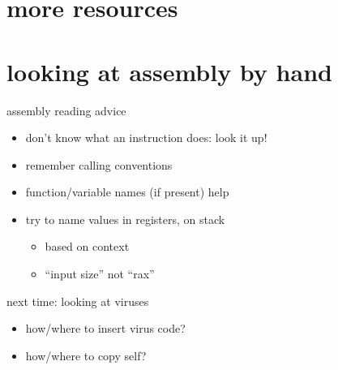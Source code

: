 \section{more resources}

\section{looking at assembly by hand}

\begin{frame}{assembly reading advice}
    \begin{itemize}
    \item don't know what an instruction does: look it up!
    \item remember calling conventions
    \item function/variable names (if present) help
    \item try to name values in registers, on stack
        \begin{itemize}
        \item based on context
        \item ``input size'' not ``rax''
        \end{itemize}
    \end{itemize}
\end{frame}

\begin{frame}{next time: looking at viruses}
    \begin{itemize}
    \item how/where to insert virus code?
    \item how/where to copy self?
    \end{itemize}
\end{frame}
